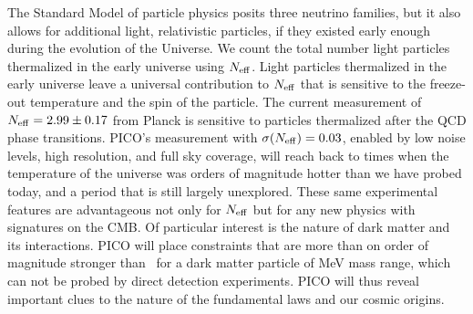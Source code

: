 \documentclass[PICOReport.tex]{subfiles}
\begin{document}
The Standard Model of particle physics posits three neutrino families, but it also allows for additional light, relativistic particles, if they existed early enough during the evolution of the Universe.   We count the total number light particles thermalized in the early universe using ${N_{\rm eff}}$. Light particles thermalized in the early universe leave a universal contribution to ${N_{\rm eff}}$ that is sensitive to the freeze-out temperature and the spin of the particle.  
The current measurement of ${N_{\rm eff}} = 2.99 \pm 0.17$  from Planck is sensitive to particles thermalized after the QCD phase transitions. PICO's measurement with $\sigma({N_{\rm eff}})=0.03$, enabled by low noise levels, high resolution, and full sky coverage, will reach back to times when the temperature of the universe was orders of magnitude hotter than we have probed today, and a period that is still largely unexplored.   
These same experimental features are advantageous not only for ${N_{\rm eff}}$ but for any new physics with signatures on the CMB. Of particular interest is the nature of dark matter and its interactions. PICO will place constraints that are more than on order of magnitude stronger than \planck\ for a dark matter particle of MeV mass range, which can not be probed by direct detection experiments. PICO will thus reveal important clues to the nature of the fundamental laws and our cosmic origins. 



\end{document}
